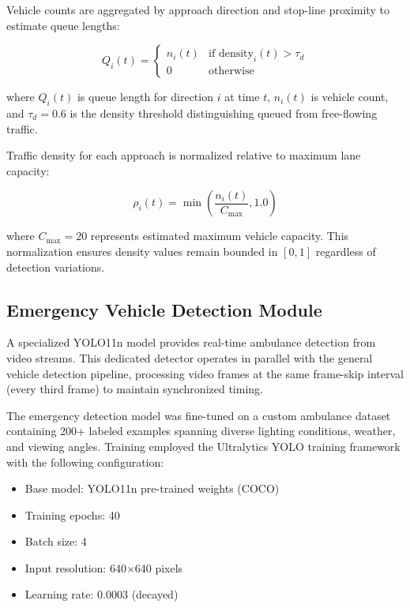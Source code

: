 \documentclass[10pt,conference]{IEEEtran}
\begin{document}
Vehicle counts are aggregated by approach direction and stop-line proximity to estimate queue lengths:

\begin{equation}
Q_i(t) = \begin{cases}
n_i(t) & \text{if density}_i(t) > \tau_d \\
0 & \text{otherwise}
\end{cases}
\end{equation}

where $Q_i(t)$ is queue length for direction $i$ at time $t$, $n_i(t)$ is vehicle count, and $\tau_d = 0.6$ is the density threshold distinguishing queued from free-flowing traffic.

Traffic density for each approach is normalized relative to maximum lane capacity:

\begin{equation}
\rho_i(t) = \min\left(\frac{n_i(t)}{C_{\max}}, 1.0\right)
\end{equation}

where $C_{\max} = 20$ represents estimated maximum vehicle capacity. This normalization ensures density values remain bounded in $[0, 1]$ regardless of detection variations.

\subsection{Emergency Vehicle Detection Module}

A specialized YOLO11n model provides real-time ambulance detection from video streams. This dedicated detector operates in parallel with the general vehicle detection pipeline, processing video frames at the same frame-skip interval (every third frame) to maintain synchronized timing.

The emergency detection model was fine-tuned on a custom ambulance dataset containing 200+ labeled examples spanning diverse lighting conditions, weather, and viewing angles. Training employed the Ultralytics YOLO training framework with the following configuration:
\begin{itemize}
    \item Base model: YOLO11n pre-trained weights (COCO)
    \item Training epochs: 40
    \item Batch size: 4
    \item Input resolution: 640×640 pixels
    \item Learning rate: 0.0003 (decayed)
\end{itemize}
\end{document}
